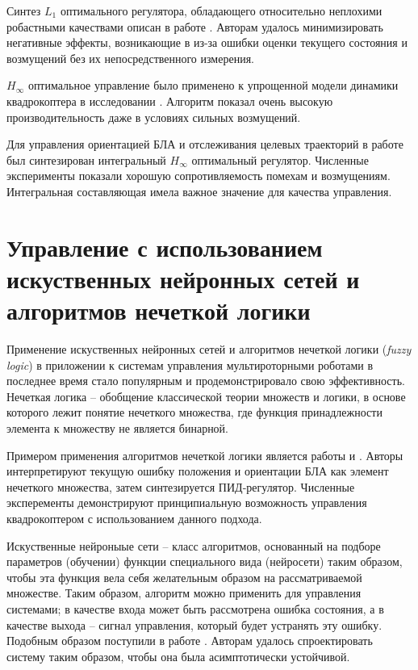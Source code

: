 Синтез $L_1$ оптимального регулятора, обладающего относительно неплохими робастными качествами описан в работе \cite{Satici01}. Авторам удалось минимизировать негативные эффекты, возникающие в из-за ошибки оценки текущего состояния и возмущений без их непосредственного измерения.

$H_{\infty}$ оптимальное управление было применено к упрощенной модели динамики квадрокоптера в исследовании \cite{Falkenberg01}. Алгоритм показал очень высокую производительность даже в условиях сильных возмущений.

Для управления ориентацией БЛА и отслеживания целевых траекторий в работе \cite{Raffo01} был синтезирован интегральный $H_{\infty}$ оптимальный регулятор. Численные эксперименты показали хорошую сопротивляемость помехам и возмущениям. Интегральная составляющая имела важное значение для качества управления.

\section{Управление с использованием искуственных нейронных сетей и алгоритмов нечеткой логики}

Применение искуственных нейронных сетей и алгоритмов нечеткой логики (\textit{fuzzy logic}) в приложении к системам управления мультироторными роботами в последнее время стало популярным и продемонстрировало свою эффективность. Нечеткая логика  -- обобщение классической теории множеств и логики, в основе которого лежит понятие нечеткого множества, где функция принадлежности элемента к множеству не является бинарной.

Примером применения алгоритмов нечеткой логики является работы \cite{Dierks01} и \cite{Santos01}. Авторы интерпретируют текущую ошибку положения и ориентации БЛА как элемент нечеткого множества, затем синтезируется ПИД-регулятор. Численные эксперементы демонстрируют принципиальную возможность управления квадрокоптером с использованием данного подхода.

Искуственные нейроныые сети -- класс алгоритмов, основанный на подборе параметров (обучении) функции специального вида (нейросети) таким образом, чтобы эта функция вела себя желательным образом на рассматриваемой множестве. Таким образом, алгоритм можно применить для управления системами; в качестве входа может быть рассмотрена ошибка состояния, а в качестве выхода -- сигнал управления, который будет устранять эту ошибку. Подобным образом поступили в работе \cite{Nicol01}. Авторам удалось спроектировать систему таким образом, чтобы она была асимптотически устойчивой.

